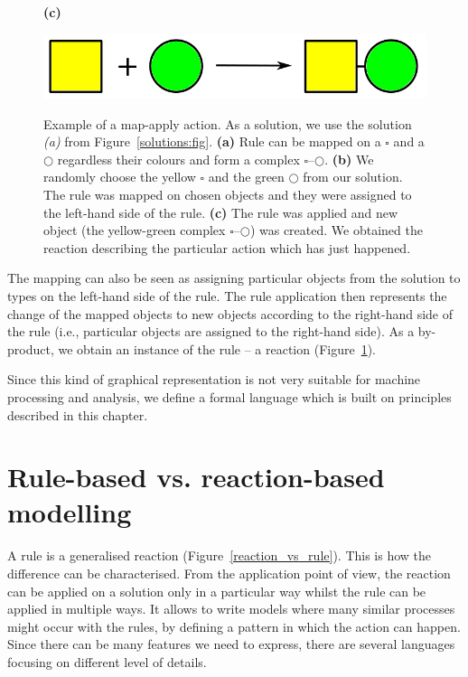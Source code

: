 \documentclass[12pt, twoside]{fithesis2} %
\begin{document}
\begin{figure}[!h]
\begin{center}
\begin{minipage}[l]{0.1\textwidth}
    \textbf{(c)}
  \end{minipage}
  \begin{minipage}[r]{0.6\textwidth}
    {\hspace*{1.3cm}\includegraphics[scale=0.2]{pics/rule_reaction}}
\end{minipage}
\end{center}
\caption{Example of a map-apply action. As a solution, we use the solution \emph{(a)} from Figure~\ref{solutions:fig}. \textbf{(a)} Rule can be mapped on a {\large $\square$} and a $\bigcirc$ regardless their colours and form a complex {\large $\square$}--$\bigcirc$.  \textbf{(b)} We randomly choose the yellow {\large $\square$} and the green $\bigcirc$ from our solution. The rule was mapped on chosen objects and they were assigned to the left-hand side of the rule. \textbf{(c)} The rule was applied and new object (the yellow-green complex {\large $\square$}--$\bigcirc$) was created. We obtained the reaction describing the particular action which has just happened.}\label{map-apply:fig}
\end{figure}

The mapping can also be seen as assigning particular objects from the solution to types on the left-hand side of the rule. The rule application then represents the change of the mapped objects to new objects according to the right-hand side of the rule (i.e., particular objects are assigned to the right-hand side). As a by-product, we obtain an instance of the rule -- a reaction (Figure~\ref{map-apply:fig}).

Since this kind of graphical representation is not very suitable for machine processing and analysis, we define a formal language which is built on principles described in this chapter.

\section{Rule-based vs. reaction-based modelling}

A rule is a generalised reaction (Figure~\ref{reaction_vs_rule}). This is how the difference can be characterised. From the application point of view, the reaction can be applied on a solution only in a particular way whilst the rule can be applied in multiple ways. It allows to write models where many similar processes might occur with the rules, by defining a pattern in which the action can happen. Since there can be many features we need to express, there are several languages focusing on different level of details.
\end{document}
